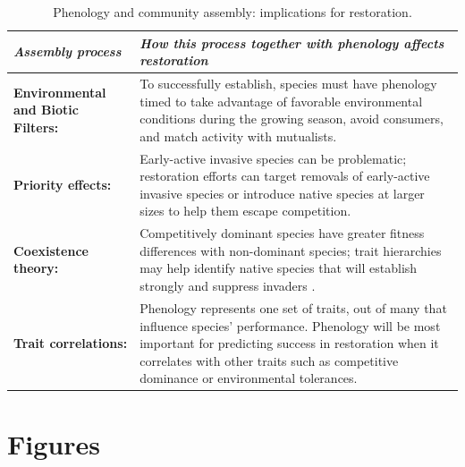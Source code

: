 \documentclass[11pt]{article}
\begin{document}
\begin{table}
\caption{Phenology and community assembly: implications for restoration.}
\begin{tabular}{ p{3 cm}  p{13 cm} }  \hline \hline
 \emph{Assembly process}   & \emph{How this process together with phenology affects restoration}\\ 
\hline \hline
{\bf Environmental and Biotic Filters:}  & To successfully establish, species must have phenology timed to take advantage of favorable environmental conditions during the growing season, avoid consumers, and match activity with mutualists. \\\hline
{\bf Priority effects:}  & Early-active invasive species can be problematic; restoration efforts can target removals of early-active invasive species or introduce native species at larger sizes to help them escape competition.  \\\hline
{\bf Coexistence theory:}  &  Competitively dominant species have greater fitness differences with non-dominant species; trait hierarchies may help identify native species that will establish strongly and suppress invaders \citep{wagg2017functional}. %
 \\\hline
{\bf Trait correlations:}  & Phenology represents one set of traits, out of many that influence species’ performance. Phenology will be most important for predicting success in restoration when it correlates with other traits such as competitive dominance or environmental tolerances.\\\hline
\hline
\end{tabular}
\label{tab:glossary}
\end{table}

\newpage
\section{Figures}
\end{document}
